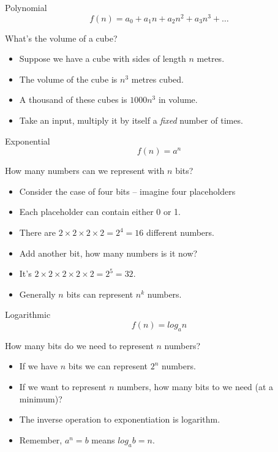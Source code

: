 \begin{frame}{Polynomial}
  \[ f(n) = a_0 + a_1 n + a_2 n^2 + a_3 n^3 + \ldots \]
  \begin{alertblock}{What's the volume of a cube?}
    \begin{itemize}
      \item Suppose we have a cube with sides of length $n$ metres.
      \item The volume of the cube is $n^3$ metres cubed.
      \item A thousand of these cubes is $1000n^3$ in volume.
      \item Take an input, multiply it by itself a \emph{fixed} number of times.
    \end{itemize}
  \end{alertblock}
\end{frame}


\begin{frame}{Exponential}
  \[ f(n) = a^n \]
  \begin{alertblock}{How many numbers can we represent with $n$ bits?}
    \begin{itemize}
      \item Consider the case of four bits -- imagine four placeholders \textbf{}\textbf{}\textbf{}\textbf{}
      \item Each placeholder can contain either 0 or 1.
      \item There are $2 \times 2 \times 2 \times 2 = 2^4 = 16$ different numbers.
      \item Add another bit, how many numbers is it now?
      \item It's $2 \times 2 \times 2 \times 2 \times 2 = 2^5 = 32$.
      \item Generally $n$ bits can represent $n^k$ numbers.
    \end{itemize}
  \end{alertblock}
\end{frame}

\begin{frame}{Logarithmic}
  \[ f(n) = log_a n \]
  \begin{alertblock}{How many bits do we need to represent $n$ numbers?}
    \begin{itemize}
      \item If we have $n$ bits we can represent $2^n$ numbers.
      \item If we want to represent $n$ numbers, how many bits to we need (at a minimum)?
      \item The inverse operation to exponentiation is logarithm.
      \item Remember, $a^n = b$ means $log_a b = n$.
    \end{itemize}
  \end{alertblock}
\end{frame}




